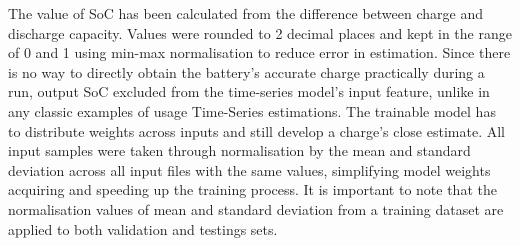 %
%
The value of SoC has been calculated from the difference between charge and discharge capacity.
Values were rounded to 2 decimal places and kept in the range of 0 and 1 using min-max normalisation to reduce error in estimation.
Since there is no way to directly obtain the battery's accurate charge practically during a run, output SoC excluded from the time-series model's input feature, unlike in any classic examples of usage Time-Series estimations.
The trainable model has to distribute weights across inputs and still develop a charge's close estimate.
All input samples were taken through normalisation by the mean and standard deviation across all input files with the same values, simplifying model weights acquiring and speeding up the training process.
It is important to note that the normalisation values of mean and standard deviation from a training dataset are applied to both validation and testings sets.

